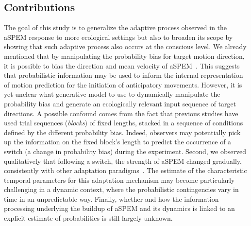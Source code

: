 \documentclass[12pt,english]{article}%
\newcommand{\citep}[1]{\parencite{#1}}
\newcommand{\seeSec}[1]{Section~\ref{sec:#1}}
\begin{document}
\subsection{Contributions}%
The goal of this study is to generalize the adaptive process
observed in the aSPEM response to more ecological settings but
also to broaden its scope by showing that such adaptive process
also occurs at the conscious level.
We already mentioned that by manipulating the probability bias for target motion direction,
it is possible to bias the direction and mean velocity of aSPEM~\citep{Montagnini2010}.
This suggests that probabilistic information may be used
to inform the internal representation of motion prediction
for the initiation of anticipatory movements.
However, it is yet unclear what generative model to use
to dynamically manipulate the probability bias
and generate an ecologically relevant input sequence of target directions.
A possible confound comes from the fact that 
previous studies have used trial sequences (\textit{blocks}) of fixed lengths,
stacked in a sequence of conditions defined by the different probability bias.
Indeed, observers may potentially pick up
the information on the fixed block's length 
to predict the occurrence of a switch (a change in probability bias) during the experiment.
Second, we observed qualitatively that following a switch,
the strength of aSPEM changed gradually,
consistently with other adaptation paradigms~\citep{Fukushima1996,Kahlon1996,Souto13}.
The estimate of the characteristic temporal parameters for this  adaptation mechanism 
may become particularly challenging in a dynamic context,
where the probabilistic contingencies vary in time in an unpredictable way.
Finally, whether and how the information processing underlying
the buildup of aSPEM and its dynamics is linked to
an explicit estimate of probabilities is still largely unknown.
\end{document}
